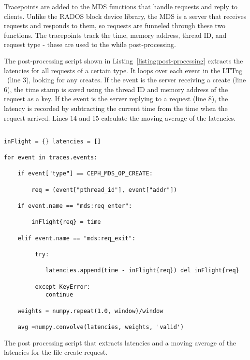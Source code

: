 \documentclass[conference]{acm_proc_article-sp} \usepackage[english]{babel}
\begin{document}
Tracepoints are added to the MDS functions that handle requests and reply to
clients. Unlike the RADOS block device library, the MDS is a server that
receives requests and responds to them, so requests are funneled through these
two functions. The tracepoints track the time, memory address, thread ID, and
request type - these are used to the while post-processing.


The post-processing script shown in Listing~\ref{listing:post-processing}
extracts the latencies for all requests of a certain type. It loops over each
event in the LTTng \ (line 3), looking for any creates. If the event is the
server receiving a create (line 6), the time stamp is saved using the thread ID
and memory address of the request as a key. If the event is the server replying
to a request (line 8), the latency is recorded by subtracting the current time
from the time when the request arrived. Lines 14 and 15 calculate the moving
average of the latencies.

\begin{listing} 

\begin{verbatim} 

inFlight = {} latencies = [] 

for event in traces.events: 

	if event["type"] == CEPH_MDS_OP_CREATE: 
    
    	req = (event["pthread_id"], event["addr"]) 
        
    if event.name == "mds:req_enter": 
    
    	inFlight{req} = time 
        
    elif event.name == "mds:req_exit": 
    
         try:

			latencies.append(time - inFlight{req}) del inFlight{req} 
            
         except KeyError:
         	continue
            
    weights = numpy.repeat(1.0, window)/window 
    
    avg =numpy.convolve(latencies, weights, 'valid') 

\end{verbatim} 

\caption{The post processing script that extracts latencies and a moving average of the latencies
for the file create request.\label{listing:post-processing}} 

\end{listing}
\end{document}
